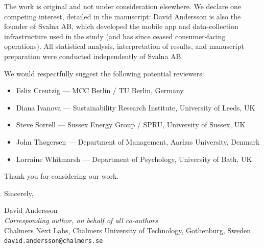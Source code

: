 \documentclass[12pt,a4paper]{article}
\begin{document}
The work is original and not under consideration elsewhere. We declare one competing interest, detailed in the manuscript: David Andersson is also the founder of Svalna AB, which developed the mobile app and data-collection infrastructure used in the study (and has since ceased consumer-facing operations). All statistical analysis, interpretation of results, and manuscript preparation were conducted independently of Svalna AB.

We would respectfully suggest the following potential reviewers:

\begin{itemize}[noitemsep, topsep=0.5em, leftmargin=1.5em]
  \item Felix Creutzig --- MCC Berlin / TU Berlin, Germany
  \item Diana Ivanova --- Sustainability Research Institute,
        University of Leeds, UK
  \item Steve Sorrell --- Sussex Energy Group / SPRU,
        University of Sussex, UK
  \item John Th{\o}gersen --- Department of Management,
        Aarhus University, Denmark
  \item Lorraine Whitmarsh --- Department of Psychology,
        University of Bath, UK
\end{itemize}

Thank you for considering our work.

\bigskip

Sincerely,

David Andersson\\[0.2em]
\textit{Corresponding author, on behalf of all co-authors}\\[0.2em]
Chalmers Next Labs, Chalmers University of Technology, Gothenburg, Sweden\\[0.2em]
\texttt{david.andersson@chalmers.se}
\end{document}
